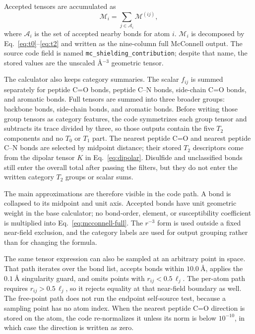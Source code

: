 \documentclass[11pt]{article}
\begin{document}
Accepted tensors are accumulated as
\begin{equation}
  \mathcal M_i = \sum_{j\in \mathcal A_i}\mathcal M^{(ij)},
  \label{eq:sum}
\end{equation}
where \(\mathcal A_i\) is the set of accepted nearby bonds for atom \(i\).
\(\mathcal M_i\) is decomposed by Eq.~\eqref{eq:t0}--\eqref{eq:t2} and written
as the nine-column full McConnell output. The source code field is named
\texttt{mc\_shielding\_contribution}; despite that name, the stored values are
the unscaled \(\si{\angstrom^{-3}}\) geometric tensor.

The calculator also keeps category summaries. The scalar \(f_{ij}\) is summed
separately for peptide C=O bonds, peptide C--N bonds, side-chain C=O bonds, and
aromatic bonds. Full tensors are summed into three broader groups: backbone
bonds, side-chain bonds, and aromatic bonds. Before writing those group tensors
as category features, the code symmetrizes each group tensor and subtracts its
trace divided by three, so those outputs contain the five \(T_2\) components
and no \(T_0\) or \(T_1\) part. The nearest peptide C=O and nearest peptide
C--N bonds are selected by midpoint distance; their stored \(T_2\) descriptors
come from the dipolar
tensor \(K\) in Eq.~\eqref{eq:dipolar}. Disulfide and unclassified bonds still
enter the overall total after passing the filters, but they do not enter the
written category \(T_2\) groups or scalar sums.

The main approximations are therefore visible in the code path. A bond is
collapsed to its midpoint and unit axis. Accepted bonds have unit geometric
weight in the base calculator; no bond-order, element, or susceptibility
coefficient is multiplied into Eq.~\eqref{eq:mcconnell-full}. The \(r^{-3}\)
form is used outside a fixed near-field exclusion, and the category labels are
used for output grouping rather than for changing the formula.

The same tensor expression can also be sampled at an arbitrary point in space.
That path iterates over the bond list, accepts bonds within
\(\SI{10.0}{\angstrom}\), applies the \(\SI{0.1}{\angstrom}\) singularity
guard, and omits points with
\(r_{ij}<0.5\,\ell_j\). The per-atom path requires \(r_{ij}>0.5\,\ell_j\), so
it rejects equality at that near-field boundary as well. The free-point path
does not run the endpoint self-source
test, because a sampling point has no atom index. When the nearest peptide C=O
direction is stored on the atom, the code re-normalizes it unless its norm is
below \(10^{-10}\), in which case the direction is written as zero.
\end{document}
